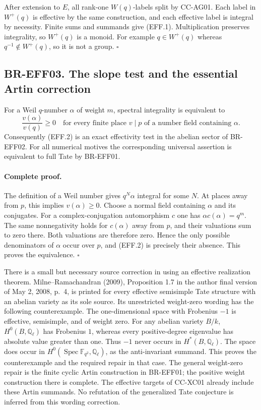 After extension to $E$, all rank-one $W(q)$-labels split by
CC-AG01.  Each label in $W^+(q)$ is effective by the same
construction, and each effective label is integral by necessity.
Finite sums and summands give (EFF.1).  Multiplication preserves
integrality, so $W^+(q)$ is a monoid.  For example $q\in W^+(q)$
whereas $q^{-1}\notin W^+(q)$, so it is not a group.
\(\square\)

\subsection{BR-EFF03. The slope test and the essential Artin correction}
For a Weil $q$-number $\alpha$ of weight $m$, spectral integrality
is equivalent to
\[
 \frac{v(\alpha)}{v(q)}\geq0
 \quad\text{for every finite place }v\mid p
 \text{ of a number field containing }\alpha.
 \tag{EFF.2}
\]
Consequently (EFF.2) is an exact effectivity test in the abelian
sector of BR-EFF02.  For all numerical motives the corresponding
universal assertion is equivalent to full Tate by BR-EFF01.

\paragraph{Complete proof.}
The definition of a Weil number gives $q^N\alpha$ integral for
some $N$.  At places away from $p$, this implies $v(\alpha)\geq0$.
Choose a normal field containing $\alpha$ and its conjugates.
For a complex-conjugation automorphism $c$ one has
$\alpha c(\alpha)=q^m$.  The same nonnegativity holds for
$c(\alpha)$ away from $p$, and their valuations sum to zero
there.  Both valuations are therefore zero.  Hence the only
possible denominators of $\alpha$ occur over $p$, and (EFF.2)
is precisely their absence.  This proves the equivalence.
\(\square\)

There is a small but necessary source correction in using an
effective realization theorem.  Milne--Ramachandran (2009),
Proposition 1.7 in the author final version of May 2, 2008,
p.~4, is printed for every effective semisimple Tate structure
with an abelian variety as its sole source.  Its unrestricted
weight-zero wording has the following counterexample.
The one-dimensional space with Frobenius $-1$ is effective,
semisimple, and of weight zero.  For any abelian variety $B/k$,
$H^0(B,\mathbb Q_\ell)$ has Frobenius $1$, whereas every
positive-degree eigenvalue has absolute value greater than one.
Thus $-1$ never occurs in $H^*(B,\mathbb Q_\ell)$.
The space does occur in
$H^0(\operatorname{Spec}\mathbb F_{q^2},\mathbb Q_\ell)$, as
the anti-invariant summand.  This proves the counterexample and
the required repair in that case.  The general weight-zero repair
is the finite cyclic Artin construction in BR-EFF01; the positive
weight construction there is complete.  The effective targets of
CC-XC01 already include these Artin summands.  No refutation of
the generalized Tate conjecture is inferred from this wording
correction.

